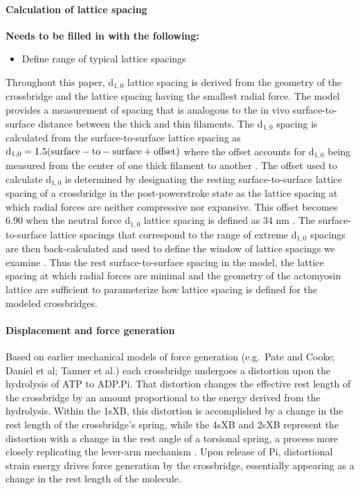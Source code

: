 \documentclass[]{article}
\begin{document}


\paragraph{Calculation of lattice spacing} %
\textbf{Needs to be filled in with the following:}
\begin{itemize}
 \item Define range of typical lattice spacings
\end{itemize}
Throughout this paper, d$_{1,0}$ lattice spacing is derived from the geometry of the crossbridge and the lattice spacing having the smallest radial force. 
The model provides a measurement of spacing that is analogous to the in vivo surface-to-surface distance between the thick and thin filaments.
The d$_{1,0}$ spacing is calculated from the surface-to-surface lattice spacing as $\rm{d}_{1,0} = 1.5 (surface-to-surface + offset)$ where the offset accounts for d$_{1,0}$ being measured from the center of one thick filament to another \citep{Millman1998}.
The offset used to calculate d$_{1,0}$ is determined by designating the resting surface-to-surface lattice spacing of a crossbridge in the post-powerstroke state as the lattice spacing at which radial forces are neither compressive nor expansive.  
This offset becomes 6.90 when the neutral force d$_{1,0}$ lattice spacing is defined as 34 nm \citep{Brenner1991}. 
The surface-to-surface lattice spacings that correspond to the range of extreme d$_{1,0}$ spacings are then back-calculated and used to define the window of lattice spacings we examine \citep{Millman1998}. %
Thus the rest surface-to-surface spacing in the model, the lattice spacing at which radial forces are minimal and the geometry of the actomyosin lattice are sufficient to parameterize how lattice spacing is defined for the modeled crossbridges. 

\paragraph{Displacement and force generation} %
Based on earlier mechanical models of force generation (e.g.\ Pate and Cooke; Daniel et al; Tanner et al.) each crossbridge undergoes a distortion upon the hydrolysis of ATP to ADP.Pi.  
That distortion changes the effective rest length of the crossbridge by an amount proportional to the energy derived from the hydrolysis.  
Within the 1sXB, this distortion is accomplished by a change in the rest length of the crossbridge's spring, while the 4sXB and 2sXB represent the distortion with a change in the rest angle of a torsional spring, a process more closely replicating the lever-arm mechanism \citep{Reedy2000}.
Upon release of Pi, distortional strain energy drives force generation by the crossbridge, essentially appearing as a change in the rest length of the molecule.
\end{document}
